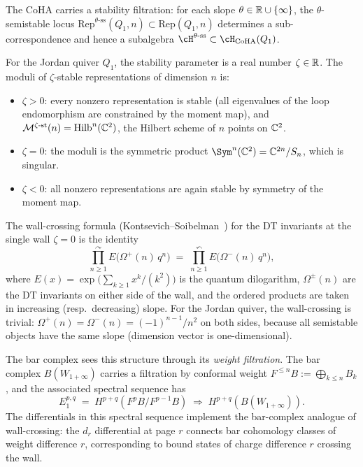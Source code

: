 \begin{conjecture}
\label{comp:wall-crossing-bar}
The CoHA carries a stability filtration: for each slope
$\theta \in \mathbb R \cup \{\infty\}$, the $\theta$-semistable locus
$\mathrm{Rep}^{\theta\text{-ss}}(Q_1, n) \subset \mathrm{Rep}(Q_1, n)$ determines a
sub-correspondence and hence a subalgebra
$\cH^{\theta\text{-ss}} \subset \cH_{\mathrm{CoHA}}(Q_1)$.

For the Jordan quiver $Q_1$, the stability parameter is a real number
$\zeta \in \mathbb R$. The moduli of $\zeta$-stable representations of
dimension $n$ is:
\begin{itemize}
\item $\zeta > 0$: every nonzero representation is stable
 \textup{(}all eigenvalues of the loop endomorphism are constrained by
 the moment map\textup{)}, and $\mathcal{M}^{\zeta\text{-st}}(n) =
 \mathrm{Hilb}^n(\mathbb C^2)$, the Hilbert scheme of $n$ points on $\mathbb C^2$.
\item $\zeta = 0$: the moduli is the symmetric product
 $\Sym^n(\CC^2) = \CC^{2n}/S_n$, which is singular.
\item $\zeta < 0$: all nonzero representations are again stable by
 symmetry of the moment map.
\end{itemize}

The wall-crossing formula
\textup{(}Kontsevich--Soibelman~\textup{\cite{kontsevich-soibelman}}\textup{)} for the
DT invariants at the single wall $\zeta = 0$ is the identity
\begin{equation}\label{eq:wall-crossing-jordan}
 \prod_{n \ge 1}^{\curvearrowright}
 E\bigl(\Omega^+(n)\, q^n\bigr)
 \;=\;
 \prod_{n \ge 1}^{\curvearrowleft}
 E\bigl(\Omega^-(n)\, q^n\bigr),
\end{equation}
where $E(x) = \exp\bigl(\sum_{k \ge 1} x^k/(k^2)\bigr)$ is the
quantum dilogarithm, $\Omega^\pm(n)$ are the DT invariants on either
side of the wall, and the ordered products are taken in increasing
\textup{(}resp.\ decreasing\textup{)} slope. For the Jordan quiver,
the wall-crossing is trivial: $\Omega^+(n) = \Omega^-(n)
= (-1)^{n-1}/n^2$ on both sides, because all semistable objects have
the same slope (dimension vector is one-dimensional).

The bar complex sees this structure through its \emph{weight filtration}.
The bar complex $B(W_{1+\infty})$ carries a filtration by conformal
weight $F^{\le n} B := \bigoplus_{k \le n} B_k$, and the associated
spectral sequence has
\[
 E_1^{p,q}
 \;=\;
 H^{p+q}(F^p B / F^{p-1} B)
 \;\Longrightarrow\;
 H^{p+q}(B(W_{1+\infty})).
\]
The differentials in this spectral sequence implement the bar-complex
analogue of wall-crossing: the $d_r$ differential at page $r$ connects
bar cohomology classes of weight difference $r$, corresponding to bound
states of charge difference $r$ crossing the wall.


\end{conjecture}
